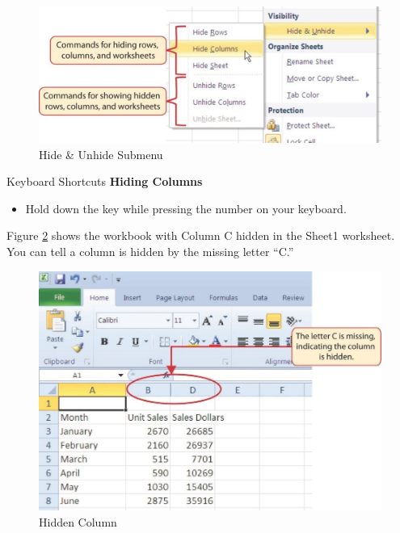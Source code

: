 \begin{figure}[H]
	\centering
	\includegraphics[width=\maxwidth{.95\linewidth}]{gfx/ch01_fig26}
	\caption{Hide \& Unhide Submenu}
	\label{01:fig26}
\end{figure}

\begin{center}
	\begin{shtcutbox}{Keyboard Shortcuts}
		\textbf{Hiding Columns}
		\\
		\begin{itemize}
			\setlength{\itemsep}{0pt}
			\setlength{\parskip}{0pt}
			\setlength{\parsep}{0pt}
			
			\item Hold down the  key while pressing the number  on your keyboard.
			
		\end{itemize}
	\end{shtcutbox}
\end{center}

Figure \ref{01:fig27} shows the workbook with Column \textsf{C} hidden in the Sheet1 worksheet. You can tell a column is hidden by the missing letter ``C.''

\begin{figure}[H]
	\centering
	\includegraphics[width=\maxwidth{.95\linewidth}]{gfx/ch01_fig27}
	\caption{Hidden Column}
	\label{01:fig27}
\end{figure}

